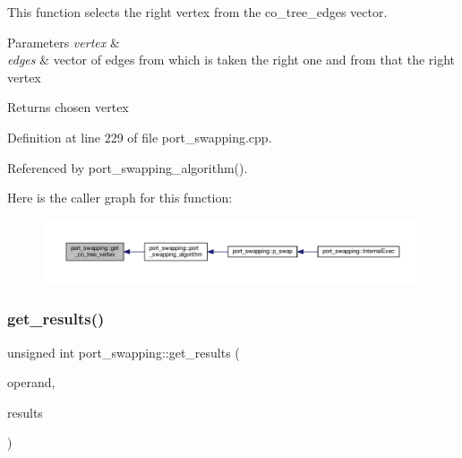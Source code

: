 This function selects the right vertex from the co\+\_\+tree\+\_\+edges vector. 


\begin{DoxyParams}{Parameters}
{\em vertex} & \\
\hline
{\em edges} & vector of edges from which is taken the right one and from that the right vertex \\
\hline
\end{DoxyParams}
\begin{DoxyReturn}{Returns}
chosen vertex 
\end{DoxyReturn}


Definition at line 229 of file port\+\_\+swapping.\+cpp.



Referenced by port\+\_\+swapping\+\_\+algorithm().

Here is the caller graph for this function\+:
\nopagebreak
\begin{figure}[H]
\begin{center}
\leavevmode
\includegraphics[width=350pt]{d6/d83/classport__swapping_a1d2a299635e0639fe2d892147940dcbf_icgraph}
\end{center}
\end{figure}
\mbox{\label{classport__swapping_a88d48f0586c1c2e0cfa54708f8b28fea}} 
\subsubsection{\texorpdfstring{get\+\_\+results()}{get\_results()}}
{\footnotesize\ttfamily unsigned int port\+\_\+swapping\+::get\+\_\+results (\begin{DoxyParamCaption}\item[{\hyperlink{classport__swapping_a9588366dd46f9f32aab2c8de93d5679f}{P\+S\+Vertex}}]{operand,  }\item[{std\+::vector$<$ std\+::pair$<$ \hyperlink{classport__swapping_a9588366dd46f9f32aab2c8de93d5679f}{P\+S\+Vertex}, unsigned int $>$$>$}]{results }\end{DoxyParamCaption})}




